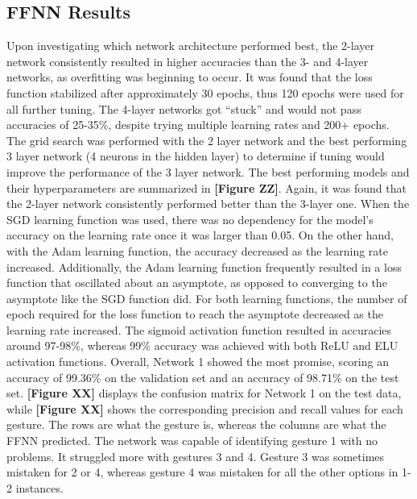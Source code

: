 \documentclass{article}
\begin{document}
\subsection*{FFNN Results}
Upon investigating which network architecture performed best, the 2-layer network consistently resulted in higher accuracies than the 3- and 4-layer networks, as overfitting was beginning to occur. It was found that the loss function stabilized after approximately 30 epochs, thus 120 epochs were used for all further tuning. The 4-layer networks got “stuck” and would not pass accuracies of 25-35\%, despite trying multiple learning rates and 200+ epochs. The grid search was performed with the 2 layer network and the best performing 3 layer network (4 neurons in the hidden layer) to determine if tuning would improve the performance of the 3 layer network. The best performing models and their hyperparameters are summarized in \textbf{[Figure ZZ]}. Again, it was found that the 2-layer network consistently performed better than the 3-layer one. When the SGD learning function was used, there was no dependency for the model’s accuracy on the learning rate once it was larger than 0.05. On the other hand, with the Adam learning function, the accuracy decreased as the learning rate increased. Additionally, the Adam learning function frequently resulted in a loss function that oscillated about an asymptote, as opposed to converging to the asymptote like the SGD function did. For both learning functions, the number of epoch required for the loss function to reach the asymptote decreased as the learning rate increased. The sigmoid activation function resulted in accuracies around 97-98\%, whereas 99\% accuracy was achieved with both ReLU and ELU activation functions. Overall, Network 1 showed the most promise, scoring an accuracy of 99.36\% on the validation set and an accuracy of 98.71\% on the test set. \textbf{[Figure XX]} displays the confusion matrix for Network 1 on the test data, while \textbf{[Figure XX]} shows the corresponding precision and recall values for each gesture. The rows are what the gesture is, whereas the columns are what the FFNN predicted. The network was capable of identifying gesture 1 with no problems. It struggled more with gestures 3 and 4. Gesture 3 was sometimes mistaken for 2 or 4, whereas gesture 4 was mistaken for all the other options in 1-2 instances.
\end{document}
